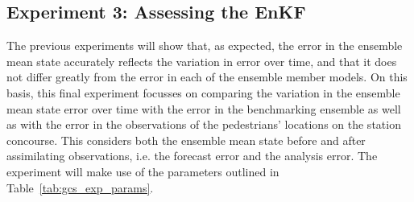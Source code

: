\documentclass{article}
\begin{document}
%
%

\subsection{Experiment 3: Assessing the EnKF}

The previous experiments will show that, as expected, the error in the ensemble mean state accurately reflects the variation in error over time, and that it does not differ greatly from the error in each of the
ensemble member models. On this basis, this final experiment focusses on comparing the variation in the ensemble mean state error over time with the error in the benchmarking ensemble as well as with the error in the observations of the pedestrians' locations on the station concourse. This considers both the ensemble mean state before and after assimilating observations, i.e. the forecast error and the analysis error. The experiment will make use of the parameters outlined in
Table~\ref{tab:gcs_exp_params}.
\end{document}
